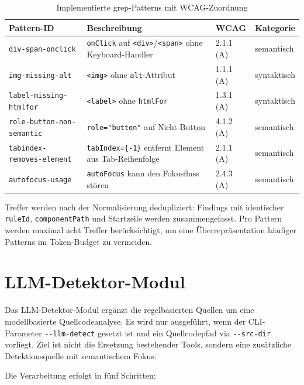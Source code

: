 \begin{table}[H]
\centering
\small
\renewcommand{\arraystretch}{1.15}
\begin{tabular}{@{}lp{5.5cm}ll@{}}
\toprule
\textbf{Pattern-ID} & \textbf{Beschreibung} & \textbf{WCAG} & \textbf{Kategorie} \\
\midrule
\texttt{div-span-onclick} & \texttt{onClick} auf \texttt{<div>}/\texttt{<span>} ohne Keyboard-Handler & 2.1.1 (A) & semantisch \\
\texttt{img-missing-alt} & \texttt{<img>} ohne \texttt{alt}-Attribut & 1.1.1 (A) & syntaktisch \\
\texttt{label-missing-htmlfor} & \texttt{<label>} ohne \texttt{htmlFor} & 1.3.1 (A) & syntaktisch \\
\texttt{role-button-non-semantic} & \texttt{role="button"} auf Nicht-Button & 4.1.2 (A) & semantisch \\
\texttt{tabindex-removes-element} & \texttt{tabIndex=\{-1\}} entfernt Element aus Tab-Reihenfolge & 2.1.1 (A) & semantisch \\
\texttt{autofocus-usage} & \texttt{autoFocus} kann den Fokusfluss stören & 2.4.3 (A) & semantisch \\
\bottomrule
\end{tabular}
\caption{Implementierte grep-Patterns mit \ac{WCAG}-Zuordnung}
\label{tab:grep-patterns}
\end{table}

Treffer werden nach der Normalisierung dedupliziert: Findings mit identischer \texttt{ruleId}, \texttt{componentPath} und Startzeile werden zusammengefasst. Pro Pattern werden maximal acht Treffer berücksichtigt, um eine Überrepräsentation häufiger Patterns im Token-Budget zu vermeiden.

\section{LLM-Detektor-Modul}
\label{sec:impl-llm-detector}

Das LLM-Detektor-Modul ergänzt die regelbasierten Quellen um eine modellbasierte Quellcodeanalyse. Es wird nur ausgeführt, wenn der CLI-Parameter \texttt{-{}-llm-detect} gesetzt ist und ein Quellcodepfad via \texttt{-{}-src-dir} vorliegt. Ziel ist nicht die Ersetzung bestehender Tools, sondern eine zusätzliche Detektionsquelle mit semantischem Fokus.

Die Verarbeitung erfolgt in fünf Schritten:

